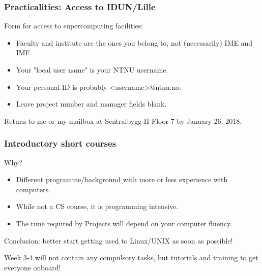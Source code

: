 \begin{frame}
  \frametitle{Practicalities: Access to IDUN/Lille}

Form for access to supercomputing facilities:
\begin{itemize}
\item Faculty and institute are the ones you belong to, not (necessarily) IME and IMF.
\item Your "local user name" is your NTNU username.
\item Your personal ID is probably <username>@ntnu.no.
\item Leave project number and manager fields blank.
\end{itemize}

Return to me or my mailbox at Sentralbygg II Floor 7 by January 26. 2018.

\end{frame}

\begin{frame}
  \frametitle{Introductory short courses}

Why?
\begin{itemize}
\item Different programme/background with more or less experience with computers.
\item While not a CS course, it is programming intensive.
\item The time required by Projects will depend on your computer fluency. 
\end{itemize}

\medskip
Conclusion: better start getting used to Linux/UNIX as soon as possible!

\medskip
Week 3-4 will not contain any compulsory tasks, but tutorials and training to get everyone onboard!

\end{frame}




